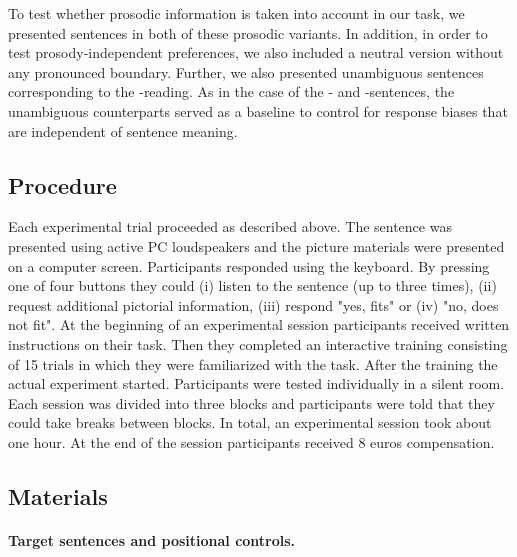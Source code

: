 \documentclass[fleqn,reqno,10pt,draft]{article}
\newcommand{\as}{\acro{as}}
\renewcommand{\es}{\acro{es}}
\newcommand{\ec}{\acro{ec}}
\begin{document}
To test whether prosodic information is taken into account in our
task, we presented sentences in both of these prosodic variants. In
addition, in order to test prosody-independent preferences, we also
included a neutral version without any pronounced boundary. Further,
we also presented unambiguous sentences corresponding to the
\ec-reading. As in the case of the \as- and \es-sentences,
the unambiguous counterparts served as a baseline to control for
response biases that are independent of sentence meaning.


\subsection{Procedure}
\label{sec:procedure} 
Each experimental trial proceeded as described above. The sentence was
presented using active PC loudspeakers and the picture materials were
presented on a computer screen. Participants responded using the
keyboard. By pressing one of four buttons they could (i) listen to the
sentence (up to three times), (ii) request additional pictorial
information, (iii) respond "yes, fits" or (iv) "no, does not fit". At
the beginning of an experimental session participants received written
instructions on their task. Then they completed an interactive
training consisting of 15 trials in which they were familiarized with
the task.  After the training the actual experiment
started. Participants were tested individually in a silent room. Each
session was divided into three blocks and participants were told that
they could take breaks between blocks. In total, an experimental
session took about one hour. At the end of the session participants
received 8 euros compensation.


\subsection{Materials}
\label{sec:materials}


\paragraph{Target sentences and positional controls.}
\end{document}
